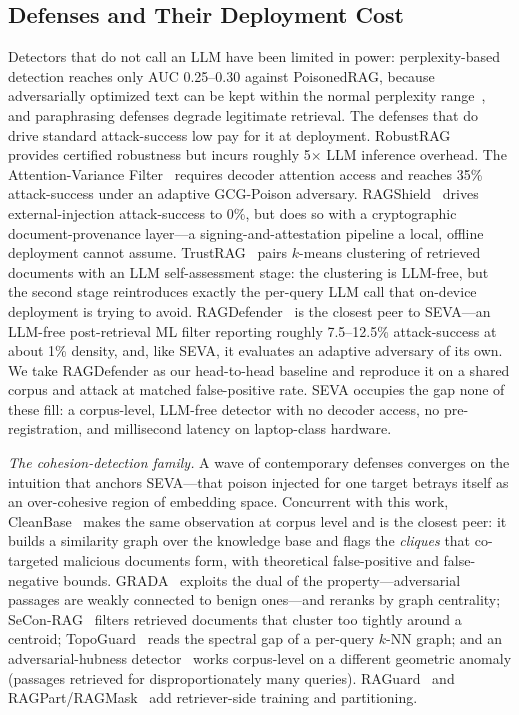 \documentclass[conference]{IEEEtran}
\begin{document}
\subsection{Defenses and Their Deployment Cost}
Detectors that do not call an LLM have been limited in power: perplexity-based
detection reaches only AUC 0.25--0.30 against PoisonedRAG, because adversarially
optimized text can be kept within the normal perplexity
range~\cite{poisonedrag}, and paraphrasing defenses degrade legitimate
retrieval. The defenses that do drive standard attack-success low pay for it at
deployment. RobustRAG~\cite{robustrag} provides certified robustness but incurs
roughly 5$\times$ LLM inference overhead. The Attention-Variance
Filter~\cite{avfilter} requires decoder attention access and reaches 35\%
attack-success under an adaptive GCG-Poison adversary. RAGShield~\cite{ragshield}
drives external-injection attack-success to 0\%, but does so with a cryptographic
document-provenance layer---a signing-and-attestation pipeline a local, offline deployment
cannot assume.
TrustRAG~\cite{trustrag} pairs $k$-means clustering of retrieved documents with an
LLM self-assessment stage: the clustering is LLM-free, but the second stage
reintroduces exactly the per-query LLM call that on-device deployment is trying to
avoid. RAGDefender~\cite{ragdefender} is the closest peer to SEVA---an LLM-free
post-retrieval ML filter reporting roughly 7.5--12.5\% attack-success at about
1\% density, and, like SEVA, it evaluates an adaptive adversary of its own. We
take RAGDefender as our head-to-head baseline and reproduce it on a shared corpus
and attack at matched false-positive rate.
SEVA occupies the gap none of these fill: a corpus-level, LLM-free detector with
no decoder access, no pre-registration, and millisecond latency on laptop-class
hardware.

\emph{The cohesion-detection family.} A wave of contemporary defenses converges on the
intuition that anchors SEVA---that poison injected for one target betrays itself as an
over-cohesive region of embedding space. Concurrent with this work, CleanBase~\cite{cleanbase}
makes the same observation at corpus level and is the closest peer: it builds a similarity graph
over the knowledge base and flags the \emph{cliques} that co-targeted malicious documents form,
with theoretical false-positive and false-negative bounds. GRADA~\cite{grada} exploits the dual
of the property---adversarial passages are weakly connected to benign ones---and reranks by graph
centrality; SeCon-RAG~\cite{secon} filters retrieved documents that cluster too tightly around a
centroid; TopoGuard~\cite{topoguard} reads the spectral gap of a per-query $k$-NN graph; and an
adversarial-hubness detector~\cite{hubness} works corpus-level on a different geometric anomaly
(passages retrieved for disproportionately many queries). RAGuard~\cite{raguard} and
RAGPart/RAGMask~\cite{ragpart} add retriever-side training and partitioning.
\end{document}
